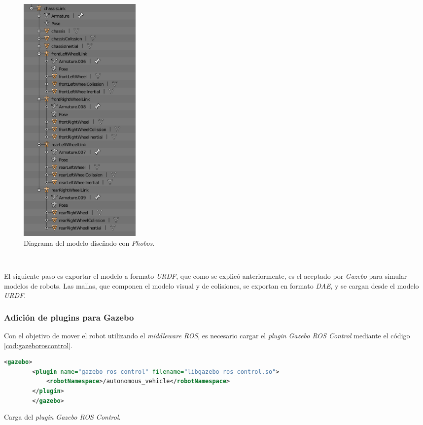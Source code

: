 \begin{figure} [h!]
	\begin{center}
		\includegraphics[width=6cm]{figs/phobosDiagram}
	\end{center}
	\caption{Diagrama del modelo diseñado con \textit{Phobos}.}
	\label{fig:blenderdiagram}
\end{figure}\

El siguiente paso es exportar el modelo a formato \textit{URDF}, que como se explicó anteriormente, es el aceptado por \textit{Gazebo} para simular modelos de robots. Las mallas,
que componen el modelo visual y de colisiones, se exportan en formato \textit{DAE}, y se cargan desde el modelo \textit{URDF}.\\

\subsubsection{Adición de plugins para Gazebo}

Con el objetivo de mover el robot utilizando el \textit{middleware ROS}, es necesario cargar el \textit{plugin} \textit{Gazebo ROS Control} mediante el código
\ref{cod:gazeboroscontrol}.\\

\begin{code}[h]
	\begin{lstlisting}[language=XML]
		<gazebo>
		<plugin name="gazebo_ros_control" filename="libgazebo_ros_control.so">
			<robotNamespace>/autonomous_vehicle</robotNamespace>
		</plugin>
		</gazebo>
	\end{lstlisting}
	\caption[Carga del \textit{plugin} \textit{Gazebo ROS Control}.]{Carga del \textit{plugin} \textit{Gazebo ROS Control}.}
	\label{cod:gazeboroscontrol}
\end{code}

